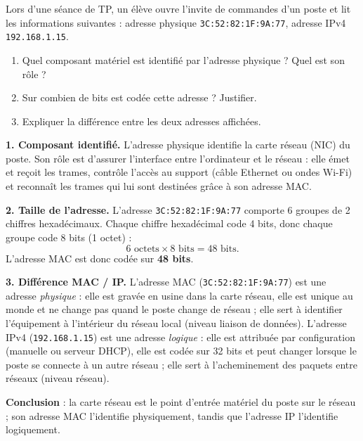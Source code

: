 \documentclass[11pt]{article}
\newcommand{\cle}[1]{{\popxbold\color{popdark}#1}}
\begin{document}
\begin{exoresolu}
Lors d'une séance de TP, un élève ouvre l'invite de commandes d'un poste et lit les informations suivantes : adresse physique \texttt{3C:52:82:1F:9A:77}, adresse IPv4 \texttt{192.168.1.15}.
\begin{enumerate}
\item Quel composant matériel est identifié par l'adresse physique ? Quel est son rôle ?
\item Sur combien de bits est codée cette adresse ? Justifier.
\item Expliquer la différence entre les deux adresses affichées.
\end{enumerate}
\tcblower
\textbf{1. Composant identifié.} L'adresse physique identifie la \cle{carte réseau} (NIC) du poste. Son rôle est d'assurer l'interface entre l'ordinateur et le réseau : elle émet et reçoit les trames, contrôle l'accès au support (câble Ethernet ou ondes Wi-Fi) et reconnaît les trames qui lui sont destinées grâce à son adresse MAC.

\textbf{2. Taille de l'adresse.} L'adresse \texttt{3C:52:82:1F:9A:77} comporte 6 groupes de 2 chiffres hexadécimaux. Chaque chiffre hexadécimal code 4 bits, donc chaque groupe code 8 bits (1 octet) :
\[ 6 \text{ octets} \times 8 \text{ bits} = 48 \text{ bits}. \]
L'adresse MAC est donc codée sur \textbf{48 bits}.

\textbf{3. Différence MAC / IP.} L'adresse MAC (\texttt{3C:52:82:1F:9A:77}) est une adresse \emph{physique} : elle est gravée en usine dans la carte réseau, elle est unique au monde et ne change pas quand le poste change de réseau ; elle sert à identifier l'équipement à l'intérieur du réseau local (niveau liaison de données). L'adresse IPv4 (\texttt{192.168.1.15}) est une adresse \emph{logique} : elle est attribuée par configuration (manuelle ou serveur DHCP), elle est codée sur 32 bits et peut changer lorsque le poste se connecte à un autre réseau ; elle sert à l'acheminement des paquets entre réseaux (niveau réseau).

\textbf{Conclusion} : la carte réseau est le point d'entrée matériel du poste sur le réseau ; son adresse MAC l'identifie physiquement, tandis que l'adresse IP l'identifie logiquement.
\end{exoresolu}
\end{document}
